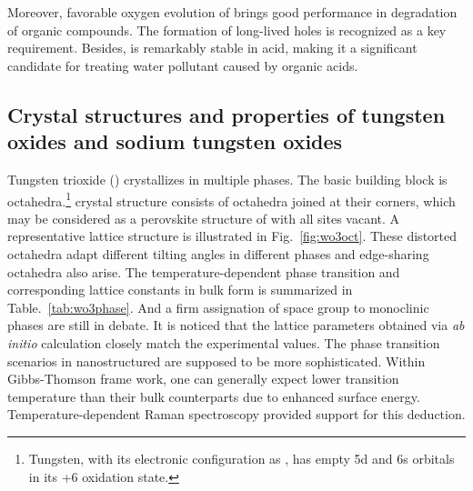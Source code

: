 Moreover, favorable oxygen evolution of  brings good performance in degradation of organic compounds\cite{Hepel2001,Luo2001,Watcharenwong2008}. The formation of long-lived holes is recognized as a key requirement.\cite{Pesci2011} Besides,  is remarkably stable in acid, making it a significant candidate for treating water pollutant caused by organic acids.\cite{Monllor-Satoca2006}

\subsection{Crystal structures and properties of tungsten oxides and sodium tungsten oxides}\label{sec:wonawo}

Tungsten trioxide () crystallizes in multiple phases. The basic building block is  octahedra.\footnote{Tungsten, with its electronic configuration as , has empty 5d and 6s orbitals in its +6 oxidation state.}  crystal structure consists of  octahedra joined at their corners, which may be considered as a perovskite structure of  with all  sites vacant. A representative lattice structure is illustrated in Fig.~\ref{fig:wo3oct}. These distorted  octahedra adapt different tilting angles in different phases and edge-sharing octahedra also arise. The temperature-dependent phase transition and corresponding lattice constants in bulk form is summarized in Table.~\ref{tab:wo3phase}.\cite{Zheng2011} And a firm assignation of space group to monoclinic phases are still in debate.\cite{Chatten2005} It is noticed that the lattice parameters obtained via \emph{ab initio} calculation closely match the experimental values.\cite{Migas2010a} The phase transition scenarios in nanostructured  are supposed to be more sophisticated. Within Gibbs-Thomson frame work, one can generally expect lower transition temperature than their bulk counterparts due to enhanced surface energy. Temperature-dependent Raman spectroscopy provided support for this deduction.\cite{Boulova2002}

